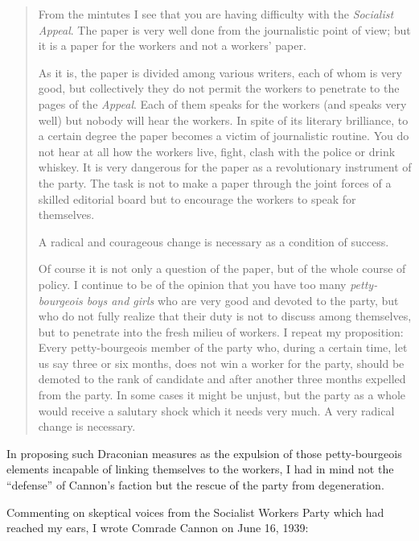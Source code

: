 \begin{quote}
  From the mintutes I see that you are having difficulty with the \emph{Socialist Appeal}. The paper is very well done from the journalistic point of view; but it is a paper for the workers and not a workers’ paper.
  
  As it is, the paper is divided among various writers, each of whom is very good, but collectively they do not permit the workers to penetrate to the pages of the \emph{Appeal}. Each of them speaks for the workers (and speaks very well) but nobody will hear the workers. In spite of its literary brilliance, to a certain degree the paper becomes a victim of journalistic routine. You do not hear at all how the workers live, fight, clash with the police or drink whiskey. It is very dangerous for the paper as a revolutionary instrument of the party. The task is not to make a paper through the joint forces of a skilled editorial board but to encourage the workers to speak for themselves.
  
  A radical and courageous change is necessary as a condition of success.
  
  Of course it is not only a question of the paper, but of the whole course of policy. I continue to be of the opinion that you have too many \emph{petty-bourgeois boys and girls} who are very good and devoted to the party, but who do not fully realize that their duty is not to discuss among themselves, but to penetrate into the fresh milieu of workers. I repeat my proposition: Every petty-bourgeois member of the party who, during a certain time, let us say three or six months, does not win a worker for the party, should be demoted to the rank of candidate and after another three months expelled from the party. In some cases it might be unjust, but the party as a whole would receive a salutary shock which it needs very much. A very radical change is necessary.
\end{quote}

In proposing such Draconian measures as the expulsion of those petty-bourgeois elements incapable of linking themselves to the workers, I had in mind not the “defense” of Cannon’s faction but the rescue of the party from degeneration.


\noindent
Commenting on skeptical voices from the Socialist Workers Party which had reached my ears, I wrote Comrade Cannon on June 16, 1939:

